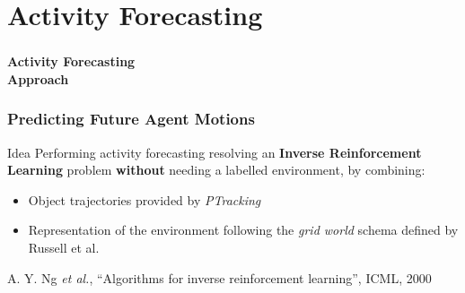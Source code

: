 \section{Activity Forecasting}

\begin{frame}
	\frametitle{}
	
	\Huge
	
	\vspace{0.5cm}
	
	\begin{center}
		\textbf{Activity Forecasting\\ Approach}
	\end{center}
\end{frame}

\begin{frame}
	\frametitle{Predicting Future Agent Motions}
	
	\vspace{0.2cm}
	
	\begin{block}{Idea}
		Performing activity forecasting resolving an \textbf{Inverse Reinforcement Learning} problem
		\textbf{without} needing a labelled environment, by combining:
		\vspace{0.05cm}
		\begin{itemize}
			\item Object trajectories provided by \emph{PTracking}
			\item Representation of the environment following the \emph{grid world} schema defined by
				  Russell et al. \cite{Ng00}
		\end{itemize}
	\end{block}
	
	\vspace{-0.1cm}
	
	\begin{center}
	\end{center}
	
	\vspace{-0.34cm}
	
	\tiny
	
	\cite{Ng00} A. Y. Ng \emph{et al.},  ``Algorithms for inverse reinforcement learning'', ICML, 2000
\end{frame}

